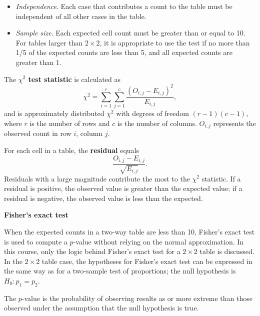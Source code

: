 \documentclass[letterpaper,12pt,twoside,]{pinp}
\begin{document}
\begin{itemize}
\item
  \emph{Independence}. Each case that contributes a count to the table
  must be independent of all other cases in the table.
\item
  \emph{Sample size}. Each expected cell count must be greater than or
  equal to 10. For tables larger than \(2 \times 2\), it is appropriate
  to use the test if no more than 1/5 of the expected counts are less
  than 5, and all expected counts are greater than 1.
\end{itemize}

The \textbf{\(\chi^2\) test statistic} is calculated as
\[\chi^2 = \sum_{i = 1}^r \sum_{j = 1}^c \dfrac{(O_{i, j} - E_{i, j})^2}{E_{i, j}}, \]
and is approximately distributed \(\chi^2\) with degrees of freedom
\((r - 1)(c - 1)\), where \(r\) is the number of rows and \(c\) is the
number of columns. \(O_{i, j}\) represents the observed count in row
\(i\), column \(j\).

For each cell in a table, the \textbf{residual} equals
\[\dfrac{O_{i, j} - E_{i, j}}{\sqrt{E_{i,j}}}. \] Residuals with a large
magnitude contribute the most to the \(\chi^2\) statistic. If a residual
is positive, the observed value is greater than the expected value; if a
residual is negative, the observed value is less than the expected.

\vspace{0.5cm}

\textbf{Fisher's exact test}

When the expected counts in a two-way table are less than 10, Fisher's
exact test is used to compute a \(p\)-value without relying on the
normal approximation. In this course, only the logic behind Fisher's
exact test for a \(2 \times 2\) table is discussed. In the
\(2 \times 2\) table case, the hypotheses for Fisher's exact test can be
expressed in the same way as for a two-sample test of proportions; the
null hypothesis is \(H_0: p_1 = p_2\).

The \(p\)-value is the probability of observing results as or more
extreme than those observed under the assumption that the null
hypothesis is true.
\end{document}
